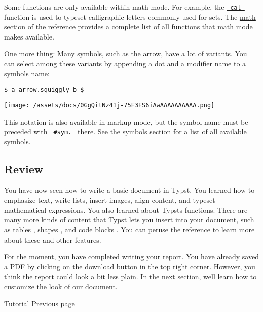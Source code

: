Some functions are only available within math mode. For example, the
\href{/docs/reference/math/variants/\#functions-cal}{\texttt{\ cal\ }}
function is used to typeset calligraphic letters commonly used for sets.
The \href{/docs/reference/math/}{math section of the reference} provides
a complete list of all functions that math mode makes available.

One more thing: Many symbols, such as the arrow, have a lot of variants.
You can select among these variants by appending a dot and a modifier
name to a symbol\textquotesingle s name:

\begin{verbatim}
$ a arrow.squiggly b $
\end{verbatim}

\texttt{[image: /assets/docs/0GgQitNz41j-75F3FS6iAwAAAAAAAAAA.png]}

This notation is also available in markup mode, but the symbol name must
be preceded with \texttt{\ \#sym.\ } there. See the
\href{/docs/reference/symbols/sym/}{symbols section} for a list of all
available symbols.

\subsection{Review}\label{review}

You have now seen how to write a basic document in Typst. You learned
how to emphasize text, write lists, insert images, align content, and
typeset mathematical expressions. You also learned about
Typst\textquotesingle s functions. There are many more kinds of content
that Typst lets you insert into your document, such as
\href{/docs/reference/model/table/}{tables} ,
\href{/docs/reference/visualize/}{shapes} , and
\href{/docs/reference/text/raw/}{code blocks} . You can peruse the
\href{/docs/reference/}{reference} to learn more about these and other
features.

For the moment, you have completed writing your report. You have already
saved a PDF by clicking on the download button in the top right corner.
However, you think the report could look a bit less plain. In the next
section, we\textquotesingle ll learn how to customize the look of our
document.

\href{/docs/tutorial/}{\pandocbounded{}}

{ Tutorial } { Previous page }

\href{/docs/tutorial/formatting/}{\pandocbounded{}}

